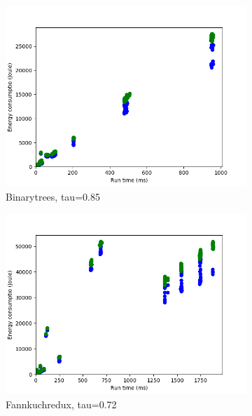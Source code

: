 \begin{figure}[h]
    \begin{subfigure}[b]{0.45\textwidth}
        \centering
        \includegraphics[width=\textwidth]{graphs/time-problem0.png}
        \caption{Binarytrees, tau=0.85}
        \label{fig:time0}
    \end{subfigure}
    \begin{subfigure}[b]{0.45\textwidth}
        \centering
        \includegraphics[width=\textwidth]{graphs/time-problem1.png}
        \caption{Fannkuchredux, tau=0.72}
        \label{fig:time1}
    \end{subfigure}
    \begin{subfigure}[b]{0.45\textwidth}
        \centering

\end{subfigure}
\end{figure}
